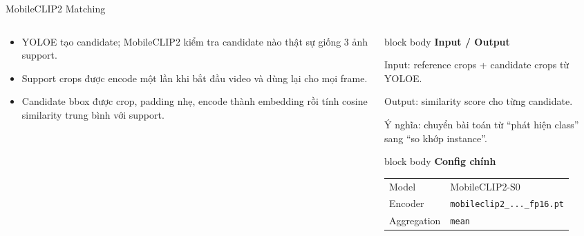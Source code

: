 \documentclass[aspectratio=169]{beamer}
\newcommand{\tightitem}{\setlength\itemsep{0.42em}}
\newenvironment{bluebox}[1]{
  \begin{beamercolorbox}[rounded=true,shadow=false,wd=\linewidth,sep=0.28cm]{block body}
  {\bfseries\color{DeepBlue}#1}\par\vspace{0.12cm}
}{
  \end{beamercolorbox}
}
\begin{document}
\begin{frame}{MobileCLIP2 Matching}
  \begin{columns}[T,onlytextwidth]
    \begin{column}{0.53\textwidth}
      \begin{itemize}
        \tightitem
        \item YOLOE tạo candidate; MobileCLIP2 kiểm tra candidate nào thật sự giống 3 ảnh support.
        \item Support crops được encode một lần khi bắt đầu video và dùng lại cho mọi frame.
        \item Candidate bbox được crop, padding nhẹ, encode thành embedding rồi tính cosine similarity trung bình với support.
      \end{itemize}
    \end{column}
    \begin{column}{0.43\textwidth}
      \begin{bluebox}{Input / Output}
        \scriptsize
        Input: reference crops + candidate crops từ YOLOE.\par
        Output: similarity score cho từng candidate.\par
        Ý nghĩa: chuyển bài toán từ ``phát hiện class'' sang ``so khớp instance''.
      \end{bluebox}
      \begin{bluebox}{Config chính}
        \scriptsize
        \begin{tabular}{ll}
          Model & MobileCLIP2-S0 \\
          Encoder & \texttt{mobileclip2\_...\_fp16.pt} \\
          Aggregation & \texttt{mean} \\
        \end{tabular}
      \end{bluebox}
    \end{column}
  \end{columns}
\end{frame}
\end{document}
